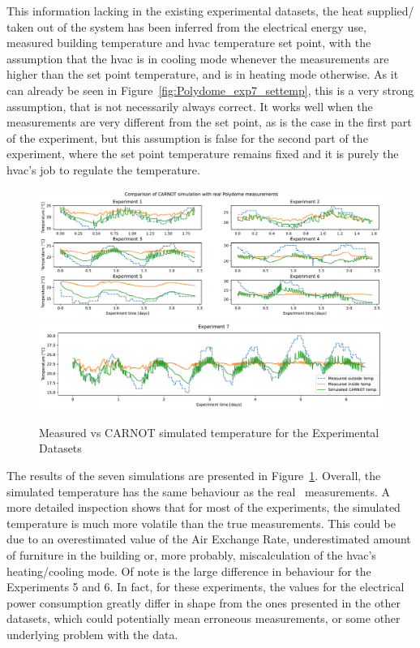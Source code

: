 This information lacking in the existing experimental datasets, the heat
supplied/ taken out of the system has been inferred from the electrical energy
use, measured building temperature and \acrshort{hvac} temperature set point,
with the assumption that the \acrshort{hvac} is in cooling mode whenever the
measurements are higher than the set point temperature, and is in heating mode
otherwise. As it can already be seen in Figure~\ref{fig:Polydome_exp7_settemp},
this is a very strong assumption, that is not necessarily always correct. It
works well when the measurements are very different from the set point, as is
the case in the first part of the experiment, but this assumption is false for
the second part of the experiment, where the set point temperature remains fixed
and it is purely the \acrshort{hvac}'s job to regulate the temperature.

\begin{figure}[ht]
    \centering
    \includegraphics[width = \textwidth]{Plots/CARNOT_comparison_1.pdf}
    \includegraphics[width = \textwidth]{Plots/CARNOT_comparison_2.pdf}
    \caption{Measured vs CARNOT simulated temperature for the Experimental
    Datasets}
    \label{fig:CARNOT_simulation_validation}
\end{figure}

The results of the seven simulations are presented in
Figure~\ref{fig:CARNOT_simulation_validation}. Overall, the simulated
temperature has the same behaviour as the real \pdome\ measurements. A more
detailed inspection shows that for most of the experiments, the simulated
temperature is much more volatile than the true measurements. This could be due
to an overestimated value of the Air Exchange Rate, underestimated amount of
furniture in the building or, more probably, miscalculation of the
\acrshort{hvac}'s heating/cooling mode. Of note is the large difference in
behaviour for the Experiments 5 and 6. In fact, for these experiments, the
values for the electrical power consumption greatly differ in shape from the
ones presented in the other datasets, which could potentially mean erroneous
measurements, or some other underlying problem with the data.

